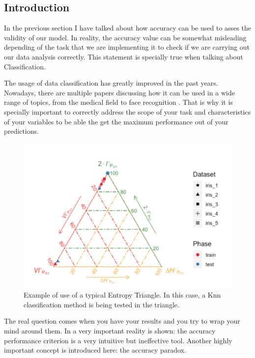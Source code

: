\subsection{Introduction}

In the previous section I have talked about how accuracy can be used to asses the validity of our model. In reality, the accuracy value can be somewhat misleading depending of the task that we are implementing it to check if we are carrying out our data analysis correctly. This statement is specially true when talking about Classification.\par

The usage of data classification has greatly improved in the past years. Nowadays, there are multiple papers discussing how it can be used in a wide range of topics, from the medical field \cite{Medical_Classification} to face recognition \cite{Balaban_2015} . That is why it is specially important to correctly address the scope of your task and characteristics of your variables to be able the get the maximum performance out of your predictions.\par

\begin{figure}[H]
 \centering
  \includegraphics[width=15cm]{Figuras_tfg/Example_ET}
  \caption{Example of use of a typical Entropy Triangle. In this case, a Knn classification method is being tested in the triangle.}
 \label{fig:figure_example_et}
\end{figure} 

The real question comes when you have your results and you try to wrap your mind around them. In \cite{val:pel:14a} a very important reality is shown: the accuracy performance criterion is a very intuitive but ineffective tool. Another highly important concept is introduced here: the accuracy paradox.\par  

